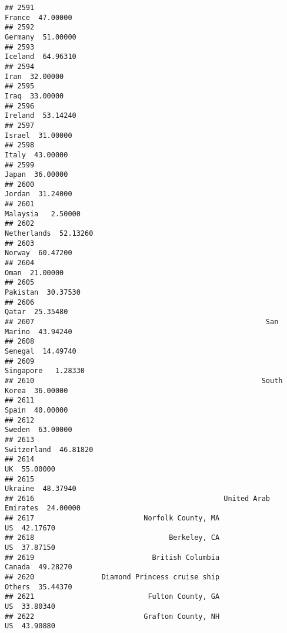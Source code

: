 \documentclass[
]{article}
\begin{document}
\begin{verbatim}
## 2591                                                           France  47.00000
## 2592                                                          Germany  51.00000
## 2593                                                          Iceland  64.96310
## 2594                                                             Iran  32.00000
## 2595                                                             Iraq  33.00000
## 2596                                                          Ireland  53.14240
## 2597                                                           Israel  31.00000
## 2598                                                            Italy  43.00000
## 2599                                                            Japan  36.00000
## 2600                                                           Jordan  31.24000
## 2601                                                         Malaysia   2.50000
## 2602                                                      Netherlands  52.13260
## 2603                                                           Norway  60.47200
## 2604                                                             Oman  21.00000
## 2605                                                         Pakistan  30.37530
## 2606                                                            Qatar  25.35480
## 2607                                                       San Marino  43.94240
## 2608                                                          Senegal  14.49740
## 2609                                                        Singapore   1.28330
## 2610                                                      South Korea  36.00000
## 2611                                                            Spain  40.00000
## 2612                                                           Sweden  63.00000
## 2613                                                      Switzerland  46.81820
## 2614                                                               UK  55.00000
## 2615                                                          Ukraine  48.37940
## 2616                                             United Arab Emirates  24.00000
## 2617                          Norfolk County, MA                   US  42.17670
## 2618                                Berkeley, CA                   US  37.87150
## 2619                            British Columbia               Canada  49.28270
## 2620                Diamond Princess cruise ship               Others  35.44370
## 2621                           Fulton County, GA                   US  33.80340
## 2622                          Grafton County, NH                   US  43.90880

\end{verbatim}
\end{document}
